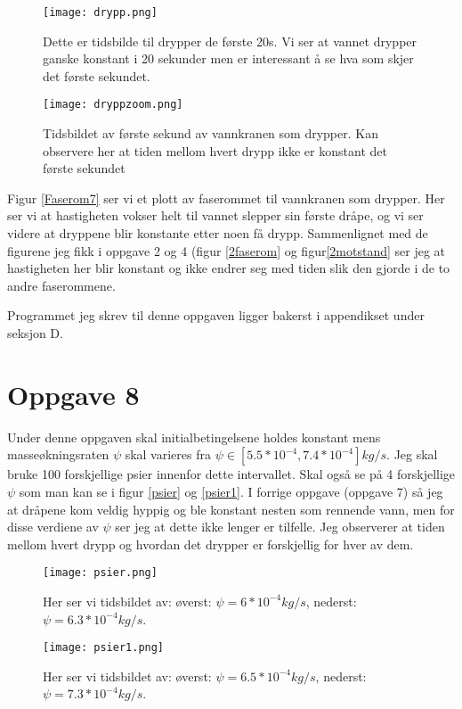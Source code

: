 \documentclass[norsk,a4paper,12pt]{article}
\begin{document}
\begin{figure}
	\begin{minipage}{\linewidth}
	\centering
	\texttt{[image: drypp.png]}
	\caption[Tidsbilde av vannkran som drypper]{Dette er tidsbilde til  drypper de første 20s. Vi ser at vannet drypper ganske konstant i 20 sekunder men er interessant å se hva som skjer det første sekundet.}
	\label{drypp}
	\end{minipage}
	\begin{minipage}{\linewidth}
	\centering
	\texttt{[image: dryppzoom.png]}
	\caption[Zoom av det første sekundet av vannet som drypper]{Tidsbildet av første sekund av vannkranen som drypper. Kan observere her at tiden mellom hvert drypp ikke er konstant det første sekundet}
	\label{zoom}
	\end{minipage}
	\hspace{0.5cm}
\end{figure}
Figur \vref{Faserom7} ser vi et plott av faserommet til vannkranen som drypper. Her ser vi at hastigheten vokser helt til vannet slepper sin første dråpe, og vi ser videre at dryppene blir konstante etter noen få drypp. Sammenlignet med de figurene jeg fikk i oppgave 2 og 4 (figur \vref{2faserom} og figur\vref{2motstand} ser jeg at hastigheten her blir konstant og ikke endrer seg med tiden slik den gjorde i de to andre faserommene. 

Programmet jeg skrev til denne oppgaven ligger bakerst i appendikset under seksjon D.

\newpage
\section{Oppgave 8}
Under denne oppgaven skal initialbetingelsene holdes konstant mens masseøkningsraten $\psi$ skal varieres fra $\psi \in [5.5*10^{-4},7.4*10^{-4}]kg/s$. Jeg skal bruke 100 forskjellige psier innenfor dette intervallet. Skal også se på 4 forskjellige $\psi$ som man kan se i figur \ref{psier} og \vref{psier1}. I forrige oppgave (oppgave 7) så jeg at  dråpene kom veldig hyppig og ble konstant nesten som rennende vann, men for disse verdiene av $\psi$ ser jeg at dette ikke lenger er tilfelle. Jeg observerer at tiden mellom hvert drypp og hvordan det drypper er forskjellig for hver av dem. 
\begin{figure}
\begin{minipage}{\linewidth}
\centering
\texttt{[image: psier.png]}
\caption[$\psi = 6*10^{-4}kg/s$, $\psi = 6.3*10^{-4}kg/s$]{Her ser vi tidsbildet av: øverst: $\psi = 6*10^{-4}kg/s$, nederst: $\psi = 6.3*10^{-4}kg/s$. }
\label{psier}
\end{minipage}
\begin{minipage}{\linewidth}
\centering
\texttt{[image: psier1.png]}
\caption[$\psi = 6.5*10^{-4}kg/s$, $\psi = 7.3*10^{-4}kg/s$]{Her ser vi tidsbildet av: øverst: $\psi = 6.5*10^{-4}kg/s$, nederst: $\psi = 7.3*10^{-4}kg/s$.}
\label{psier1}
\end{minipage}
\end{figure}
\end{document}
